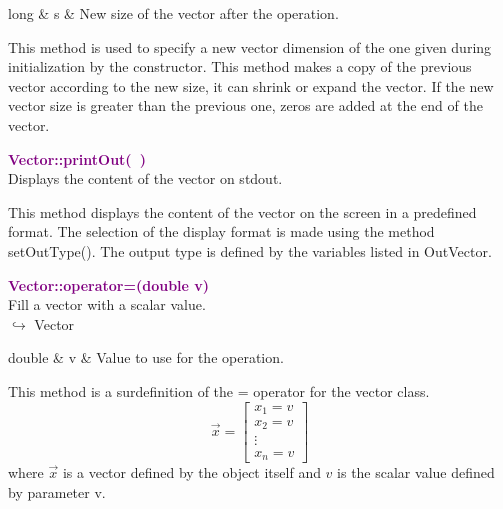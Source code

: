 \begin{tcolorbox}[width=\textwidth,myArgs,tabularx={ll|R}]
long & s & New size of the vector after the operation.
\end{tcolorbox}

This method is used to specify a new vector dimension of the one given during initialization by the constructor.
This method makes a copy of the previous vector according to the new size, \ie it can shrink or expand the vector.
If the new vector size is greater than the previous one, zeros are added at the end of the vector.

\textcolor{purple}{\textbf{Vector::printOut(~)}}\label{Vector::printOut()}\\
Displays the content of the vector on stdout.

This method displays the content of the vector on the screen in a predefined format.
The selection of the display format is made using the method setOutType().
The output type is defined by the variables listed in OutVector.

\textcolor{purple}{\textbf{Vector::operator=(double v)}}\label{Vector::operator=(double v)}\\
Fill a vector with a scalar value.\\ \hspace*{10mm}$\hookrightarrow$ Vector

\begin{tcolorbox}[width=\textwidth,myArgs,tabularx={ll|R}]
double & v & Value to use for the operation.
\end{tcolorbox}

This method is a surdefinition of the = operator for the vector class.
\begin{equation*}
\overrightarrow{x}=\left[\begin{array}{c}
  x_{1}=v\\
  x_{2}=v\\
  \vdots\\
  x_{n}=v
  \end{array}\right]
\end{equation*}
where $\overrightarrow{x}$ is a vector defined by the object itself and $v$ is the scalar value defined by parameter v.

